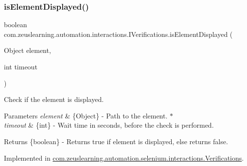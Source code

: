 \hypertarget{interfacecom_1_1zeuslearning_1_1automation_1_1interactions_1_1IVerifications_a047cd4a4c2d0096b993b0e45c885e79d}{}\label{interfacecom_1_1zeuslearning_1_1automation_1_1interactions_1_1IVerifications_a047cd4a4c2d0096b993b0e45c885e79d} 
\subsubsection{\texorpdfstring{is\+Element\+Displayed()}{isElementDisplayed()}\hspace{0.1cm}{\footnotesize\ttfamily [2/2]}}
{\footnotesize\ttfamily boolean com.\+zeuslearning.\+automation.\+interactions.\+I\+Verifications.\+is\+Element\+Displayed (\begin{DoxyParamCaption}\item[{Object}]{element,  }\item[{int}]{timeout }\end{DoxyParamCaption})}

Check if the element is displayed.


\begin{DoxyParams}{Parameters}
{\em element} & \{Object\} -\/ Path to the element. $\ast$ \\
\hline
{\em timeout} & \{int\} -\/ Wait time in seconds, before the check is performed. \\
\hline
\end{DoxyParams}
\begin{DoxyReturn}{Returns}
\{boolean\} -\/ Returns {\ttfamily true} if element is displayed, else returns {\ttfamily false}. 
\end{DoxyReturn}


Implemented in \hyperlink{classcom_1_1zeuslearning_1_1automation_1_1selenium_1_1interactions_1_1Verifications_a264caf7f6bbeaec8a7a416024ec4617b}{com.\+zeuslearning.\+automation.\+selenium.\+interactions.\+Verifications}.

\hypertarget{interfacecom_1_1zeuslearning_1_1automation_1_1interactions_1_1IVerifications_aac95057ff56c12e2a3929b60a585fdcb}{}\label{interfacecom_1_1zeuslearning_1_1automation_1_1interactions_1_1IVerifications_aac95057ff56c12e2a3929b60a585fdcb} 
